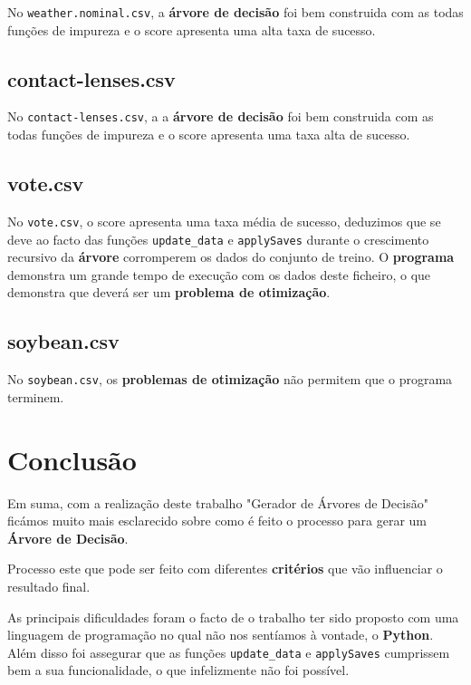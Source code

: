 \documentclass[11pt]{article}   %
\begin{document}
No \verb|weather.nominal.csv|, a \textbf{árvore de decisão} foi bem construida com as todas funções de impureza e o score apresenta uma alta taxa de sucesso.

\subsection{contact-lenses.csv}

No \verb|contact-lenses.csv|, a a \textbf{árvore de decisão} foi bem construida com as todas funções de impureza e o score apresenta uma taxa alta de sucesso.

\subsection{vote.csv}

No \verb|vote.csv|, o score apresenta uma taxa média de sucesso, deduzimos que se deve ao facto das funções \verb|update_data| e \verb|applySaves| durante o 
crescimento recursivo da \textbf{árvore} corromperem os dados do conjunto de treino.
O \textbf{programa} demonstra um grande tempo de execução com os dados deste ficheiro, o que demonstra que deverá ser um \textbf{problema de otimização}.

\subsection{soybean.csv}

No \verb|soybean.csv|, os \textbf{problemas de otimização} não permitem que o programa terminem.
\section{Conclusão} %
\hspace{0,5cm}Em suma, com a realização deste trabalho "Gerador de Árvores de Decisão" ficámos muito mais esclarecido sobre como é
feito o processo para gerar um \textbf{Árvore de Decisão}. \par
Processo este que pode ser feito com diferentes \textbf{critérios} que vão influenciar o resultado final.

As principais dificuldades foram o facto de o trabalho ter sido proposto com uma linguagem de programação no qual não nos
sentíamos à vontade, o \textbf{Python}.
Além disso foi assegurar que as funções \verb|update_data| e \verb|applySaves| cumprissem bem a sua funcionalidade, o que infelizmente não
foi possível.
\end{document}
